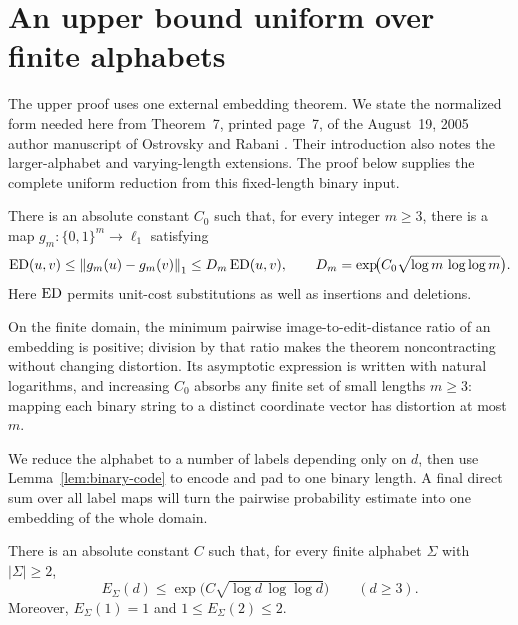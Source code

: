 \section{An upper bound uniform over finite alphabets}\label{sec:upper}

The upper proof uses one external embedding theorem. We state the
normalized form needed here from Theorem~7, printed page~7, of the
August~19, 2005 author manuscript of Ostrovsky and Rabani
\cite{OstrovskyRabani2007}. Their introduction also notes the
larger-alphabet and varying-length extensions. The proof below supplies
the complete uniform reduction from this fixed-length binary input.

\begin{theorem}\label{thm:or}
There is an absolute constant $C_0$ such that, for every integer $m\ge3$,
there is a map $g_m:\{0,1\}^m\to\ell_1$ satisfying
\begin{equation}\label{eq:or}
 \operatorname{ED}(u,v)\le\left\lVert g_m(u)-g_m(v)\right\rVert_1
 \le D_m\operatorname{ED}(u,v),\qquad
 D_m=\exp\!\bigl(C_0\sqrt{\log m\,\log\log m}\bigr).
\end{equation}
Here $\operatorname{ED}$ permits unit-cost substitutions as well as insertions and
deletions.
\end{theorem}

On the finite domain, the minimum pairwise image-to-edit-distance ratio
of an embedding is positive; division by that ratio makes the theorem
noncontracting without changing distortion. Its asymptotic expression
is written with natural logarithms, and increasing $C_0$ absorbs any
finite set of small lengths $m\ge3$: mapping each binary string to a
distinct coordinate vector has distortion at most $m$.

We reduce the alphabet to a number of labels depending only on $d$,
then use Lemma~\ref{lem:binary-code} to encode and pad to one binary
length. A final direct sum over all label maps will turn the pairwise
probability estimate into one embedding of the whole domain.

\begin{proposition}\label{prop:uniform-upper}
There is an absolute constant $C$ such that, for every finite alphabet
$\Sigma$ with $|\Sigma|\ge2$,
\begin{equation}\label{eq:upper-conclusion}
 E_\Sigma(d)\le
 \exp\!\bigl(C\sqrt{\log d\,\log\log d}\bigr)
 \qquad(d\ge3).
\end{equation}
Moreover, $E_\Sigma(1)=1$ and $1\le E_\Sigma(2)\le2$.
\end{proposition}

